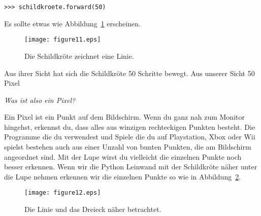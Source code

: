 \begin{Verbatim}[frame=single]
>>> schildkroete.forward(50)
\end{Verbatim}

Es sollte etwas wie Abbildung~\ref{fig11} erscheinen.

\begin{figure}
\begin{center}
\texttt{[image: figure11.eps]}
\end{center}
\caption{Die Schildkröte zeichnet eine Linie.}\label{fig11}
\end{figure}

Aus ihrer Sicht hat sich die Schildkröte 50 Schritte bewegt. Aus unserer Sicht 50 Pixel

\noindent
\emph{Was ist also ein Pixel?}

Ein Pixel ist ein Punkt auf dem Bildschirm. Wenn du ganz nah zum Monitor hingehst, erkennst du, dass alles aus winzigen rechteckigen Punkten besteht. Die Programme die du verwendest und Spiele die du auf Playstation, Xbox oder Wii spielst bestehen auch aus einer Unzahl von bunten Punkten, die am Bildschirm angeordnet sind. Mit der Lupe wirst du vielleicht die einzelnen Punkte noch besser erkennen. Wenn wir die Python Leinwand mit der Schildkröte näher unter die Lupe nehmen erkennen wir die einzelnen Punkte so wie in Abbildung~\ref{fig12}.

\begin{figure}
\begin{center}
\texttt{[image: figure12.eps]}
\end{center}
\caption{Die Linie und das Dreieck näher betrachtet.}\label{fig12}
\end{figure}

